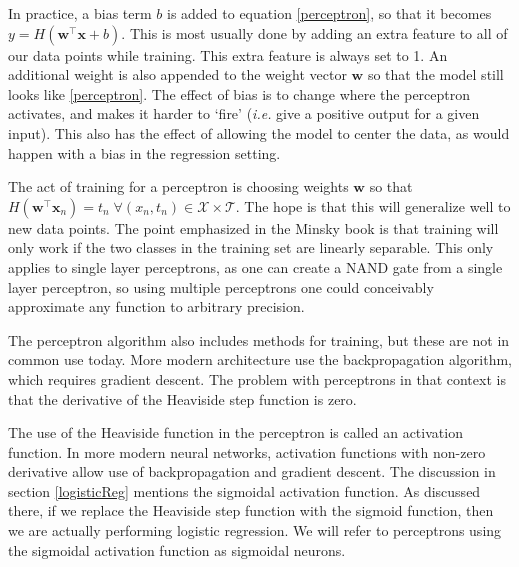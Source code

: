 In practice, a bias term \( b \) is added to equation \ref{perceptron}, so that it becomes \( y = H(\bm w^{\intercal} \bm x +b) \). This is most usually done by adding an extra feature to all of our data points while training. This extra feature is always set to 1.  An additional weight is also appended to the weight vector \( \bm w \) so that the model still looks like \ref{perceptron}. The effect of bias is to change where the perceptron activates, and makes it harder to `fire' (\textit{i.e.} give a positive output for a given input). This also has the effect of allowing the model to center the data, as would happen with a bias in the regression setting.

The act of training for a perceptron is choosing weights \( \bm w \) so that \( H(\bm w^{\intercal} \bm x_n) = t_n\;\forall (x_n,t_n)\in \mathcal{X}\times \mathcal{T} \). The hope is that this will generalize well to new data points.  The point emphasized in the Minsky book \cite{Minsky90Perceptron} is that training will only work if the two classes in the training set are linearly separable.  This only applies to single layer perceptrons, as one can create a NAND gate from a single layer perceptron, so using multiple perceptrons one could conceivably approximate any function to arbitrary precision.

The perceptron algorithm also includes methods for training, but these are not in common use today.  More modern architecture use the backpropagation algorithm, which requires gradient descent.  The problem with perceptrons in that context is that the derivative of the Heaviside step function is zero. 

The use of the Heaviside function in the perceptron is called an activation function.  In more modern neural networks, activation functions with non-zero derivative allow use of backpropagation and gradient descent.  The discussion in section \ref{logisticReg} mentions the sigmoidal activation function.  As discussed there, if we replace the Heaviside step function with the sigmoid function, then we are actually performing logistic regression.  We will refer to perceptrons using the sigmoidal activation function as sigmoidal neurons.

